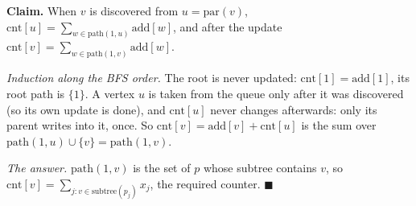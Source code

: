 \begin{invariantbox}
\textbf{Claim.} When $v$ is discovered from $u = \mathrm{par}(v)$, $\mathrm{cnt}[u] = \sum_{w \in \mathrm{path}(1, u)} \mathrm{add}[w]$, and after the update $\mathrm{cnt}[v] = \sum_{w \in \mathrm{path}(1, v)} \mathrm{add}[w]$.

\emph{Induction along the BFS order.} The root is never updated: $\mathrm{cnt}[1] = \mathrm{add}[1]$, its root path is $\{1\}$. A vertex $u$ is taken from the queue only after it was discovered (so its own update is done), and $\mathrm{cnt}[u]$ never changes afterwards: only its parent writes into it, once. So $\mathrm{cnt}[v] = \mathrm{add}[v] + \mathrm{cnt}[u]$ is the sum over $\mathrm{path}(1, u) \cup \{v\} = \mathrm{path}(1, v)$.

\emph{The answer.} $\mathrm{path}(1, v)$ is the set of $p$ whose subtree contains $v$, so $\mathrm{cnt}[v] = \sum_{j : v \in \mathrm{subtree}(p_j)} x_j$, the required counter. \hfill$\blacksquare$
\end{invariantbox}

